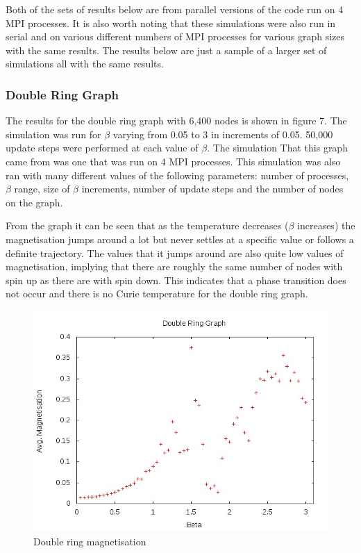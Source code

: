 \documentclass[pdftex,12pt,a4paper]{article}
\begin{document}
Both of the sets of results below are from parallel versions of the code run on 4 MPI processes. It is also worth noting that these simulations were also run in serial and on various different numbers of MPI processes for various graph sizes with the same results. The results below are just a sample of a larger set of simulations all with the same results.

\subsubsection{Double Ring Graph}

The results for the double ring graph with 6,400 nodes is shown in figure 7. The simulation was run for $\beta$ varying from 0.05 to 3 in increments of 0.05. 50,000 update steps were performed at each value of $\beta$. The simulation That this graph came from was one that was run on 4 MPI processes. This simulation was also ran with many different values of the following parameters: number of processes, $\beta$ range, size of $\beta$ increments, number of update steps and the number of nodes on the graph.

From the graph it can be seen that as the temperature decreases ($\beta$ increases) the magnetisation jumps around a lot but never settles at a specific value or follows a definite trajectory. The values that it jumps around are also quite low values of magnetisation, implying that there are roughly the same number of nodes with spin up as there are with spin down. This indicates that a phase transition does not occur and there is no Curie temperature for the double ring graph.

\begin{figure}
\centering
\includegraphics[scale=0.8]{double_ring_mag.jpg}
\caption{Double ring magnetisation}
\end{figure}
\end{document}
